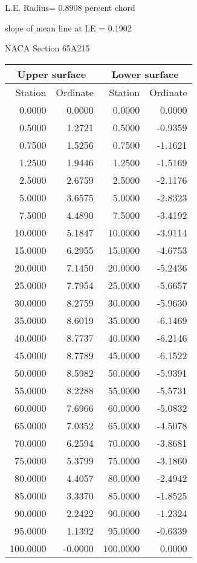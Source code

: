 \documentclass[11pt]{book}
\begin{document}
L.E. Radius=  0.8908 percent chord


 slope of mean line at LE =  0.1902
 \newpage
  \label{s65A215}
 \begin{Large}
 NACA Section 65A215
 \end{Large}
  
 \vspace{8mm}
 \begin{tabular}{|r|r|r|r|} \hline 
 \multicolumn{2}{|c|}{Upper surface} & \multicolumn{2}{|c|}{Lower surface} \\
 \hline
 Station & Ordinate & Station & Ordinate \\
 \hline
0.0000 & 0.0000 & 0.0000 & 0.0000 \\
0.5000 & 1.2721 & 0.5000 & -0.9359 \\
0.7500 & 1.5256 & 0.7500 & -1.1621 \\
1.2500 & 1.9446 & 1.2500 & -1.5169 \\
2.5000 & 2.6759 & 2.5000 & -2.1176 \\
5.0000 & 3.6575 & 5.0000 & -2.8323 \\
7.5000 & 4.4890 & 7.5000 & -3.4192 \\
10.0000 & 5.1847 & 10.0000 & -3.9114 \\
15.0000 & 6.2955 & 15.0000 & -4.6753 \\
20.0000 & 7.1450 & 20.0000 & -5.2436 \\
25.0000 & 7.7954 & 25.0000 & -5.6657 \\
30.0000 & 8.2759 & 30.0000 & -5.9630 \\
35.0000 & 8.6019 & 35.0000 & -6.1469 \\
40.0000 & 8.7737 & 40.0000 & -6.2146 \\
45.0000 & 8.7789 & 45.0000 & -6.1522 \\
50.0000 & 8.5982 & 50.0000 & -5.9391 \\
55.0000 & 8.2288 & 55.0000 & -5.5731 \\
60.0000 & 7.6966 & 60.0000 & -5.0832 \\
65.0000 & 7.0352 & 65.0000 & -4.5078 \\
70.0000 & 6.2594 & 70.0000 & -3.8681 \\
75.0000 & 5.3799 & 75.0000 & -3.1860 \\
80.0000 & 4.4057 & 80.0000 & -2.4942 \\
85.0000 & 3.3370 & 85.0000 & -1.8525 \\
90.0000 & 2.2422 & 90.0000 & -1.2324 \\
95.0000 & 1.1392 & 95.0000 & -0.6339 \\
100.0000 & -0.0000 & 100.0000 & 0.0000 \\
 \hline 
 \end{tabular}
\end{document}
